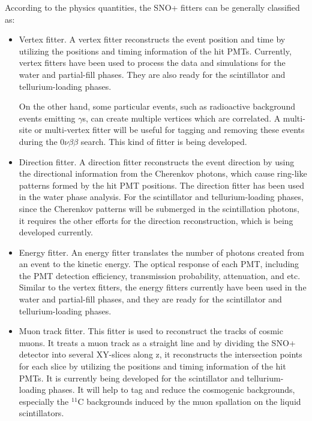 According to the physics quantities, the SNO+ fitters can be generally classified as:
\begin{itemize}
	\item Vertex fitter. A vertex fitter reconstructs the event position and time by utilizing the positions and timing information of the hit PMTs. Currently, vertex fitters have been used to process the data and simulations for the water and partial-fill phases. They are also ready for the scintillator and tellurium-loading phases.
	
    On the other hand, some particular events, such as radioactive background events emitting $\gamma$s, can create multiple vertices which are correlated. A multi-site or multi-vertex fitter will be useful for tagging and removing these events during the $0\nu\beta\beta$ search. This kind of fitter is being developed.

	\item Direction fitter. A direction fitter reconstructs the event direction by using the directional information from the Cherenkov photons, which cause ring-like patterns formed by the hit PMT positions. The direction fitter has been used in the water phase analysis. For the scintillator and tellurium-loading phases, since the Cherenkov patterns will be submerged in the scintillation photons, it requires the other efforts for the direction reconstruction, which is being developed currently. 
	
	\item Energy fitter. An energy fitter translates the number of photons created from an event to the kinetic energy. The optical response of each PMT, including the PMT detection efficiency, transmission probability, attenuation, and etc. Similar to the vertex fitters, the energy fitters currently have been used in the water and partial-fill phases, and they are ready for the scintillator and tellurium-loading phases.

	\item Muon track fitter. This fitter is used to reconstruct the tracks of cosmic muons. It treats a muon track as a straight line and by dividing the SNO+ detector into several XY-slices along z, it reconstructs the intersection points for each slice by utilizing the positions and timing information of the hit PMTs\cite{muonTrackRecon}. It is currently being developed for the scintillator and tellurium-loading phases. It will help to tag and reduce the cosmogenic backgrounds, especially the $^{11}$C backgrounds induced by the muon spallation on the liquid scintillators\cite{sorensen2016temperature}.
\end{itemize}

